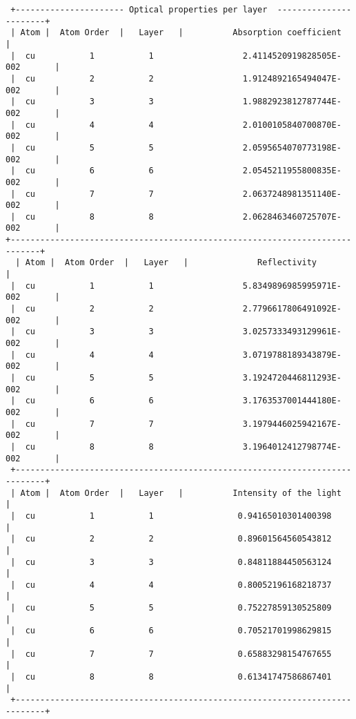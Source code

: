 \documentclass[a4paper,11pt,twoside]{book}
\begin{document}
\begin{enumerate}
\begin{verbatim}
 +---------------------- Optical properties per layer  -----------------------+
 | Atom |  Atom Order  |   Layer   |          Absorption coefficient          |
 |  cu           1           1                  2.4114520919828505E-002       |
 |  cu           2           2                  1.9124892165494047E-002       |
 |  cu           3           3                  1.9882923812787744E-002       |
 |  cu           4           4                  2.0100105840700870E-002       |
 |  cu           5           5                  2.0595654070773198E-002       |
 |  cu           6           6                  2.0545211955800835E-002       |
 |  cu           7           7                  2.0637248981351140E-002       |
 |  cu           8           8                  2.0628463460725707E-002       |
+----------------------------------------------------------------------------+
  | Atom |  Atom Order  |   Layer   |              Reflectivity               |
 |  cu           1           1                  5.8349896985995971E-002       |
 |  cu           2           2                  2.7796617806491092E-002       |
 |  cu           3           3                  3.0257333493129961E-002       |
 |  cu           4           4                  3.0719788189343879E-002       |
 |  cu           5           5                  3.1924720446811293E-002       |
 |  cu           6           6                  3.1763537001444180E-002       |
 |  cu           7           7                  3.1979446025942167E-002       |
 |  cu           8           8                  3.1964012412798774E-002       |
 +----------------------------------------------------------------------------+
 | Atom |  Atom Order  |   Layer   |          Intensity of the light          |
 |  cu           1           1                 0.94165010301400398            |
 |  cu           2           2                 0.89601564560543812            |
 |  cu           3           3                 0.84811884450563124            |
 |  cu           4           4                 0.80052196168218737            |
 |  cu           5           5                 0.75227859130525809            |
 |  cu           6           6                 0.70521701998629815            |
 |  cu           7           7                 0.65883298154767655            |
 |  cu           8           8                 0.61341747586867401            |
 +----------------------------------------------------------------------------+
\end{verbatim}


\end{enumerate}
\end{document}
